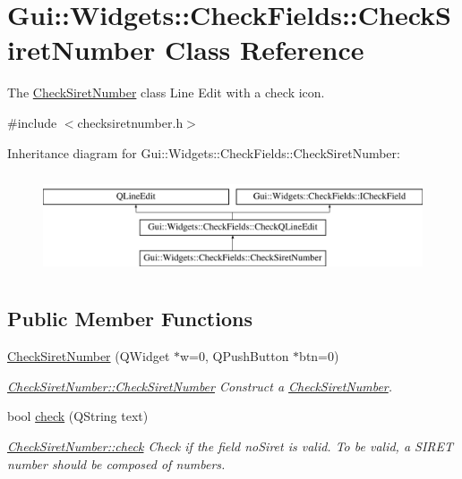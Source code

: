 \hypertarget{classGui_1_1Widgets_1_1CheckFields_1_1CheckSiretNumber}{}\section{Gui\+:\+:Widgets\+:\+:Check\+Fields\+:\+:Check\+Siret\+Number Class Reference}
\label{classGui_1_1Widgets_1_1CheckFields_1_1CheckSiretNumber}


The \hyperlink{classGui_1_1Widgets_1_1CheckFields_1_1CheckSiretNumber}{Check\+Siret\+Number} class Line Edit with a check icon.  




{\ttfamily \#include $<$checksiretnumber.\+h$>$}

Inheritance diagram for Gui\+:\+:Widgets\+:\+:Check\+Fields\+:\+:Check\+Siret\+Number\+:\begin{figure}[H]
\begin{center}
\leavevmode
\includegraphics[height=3.000000cm]{db/d94/classGui_1_1Widgets_1_1CheckFields_1_1CheckSiretNumber}
\end{center}
\end{figure}
\subsection*{Public Member Functions}
\begin{DoxyCompactItemize}
\item 
\hyperlink{classGui_1_1Widgets_1_1CheckFields_1_1CheckSiretNumber_a084cf5bf5f0630ef0a92a4bb2be8646e}{Check\+Siret\+Number} (Q\+Widget $\ast$w=0, Q\+Push\+Button $\ast$btn=0)
\begin{DoxyCompactList}\small\item\em \hyperlink{classGui_1_1Widgets_1_1CheckFields_1_1CheckSiretNumber_a084cf5bf5f0630ef0a92a4bb2be8646e}{Check\+Siret\+Number\+::\+Check\+Siret\+Number} Construct a \hyperlink{classGui_1_1Widgets_1_1CheckFields_1_1CheckSiretNumber}{Check\+Siret\+Number}. \end{DoxyCompactList}\item 
bool \hyperlink{classGui_1_1Widgets_1_1CheckFields_1_1CheckSiretNumber_a973f81b959d34b28818159303932f5f8}{check} (Q\+String text)
\begin{DoxyCompactList}\small\item\em \hyperlink{classGui_1_1Widgets_1_1CheckFields_1_1CheckSiretNumber_a973f81b959d34b28818159303932f5f8}{Check\+Siret\+Number\+::check} Check if the field no\+Siret is valid. To be valid, a S\+I\+R\+E\+T number should be composed of numbers. \end{DoxyCompactList}\end{DoxyCompactItemize}
